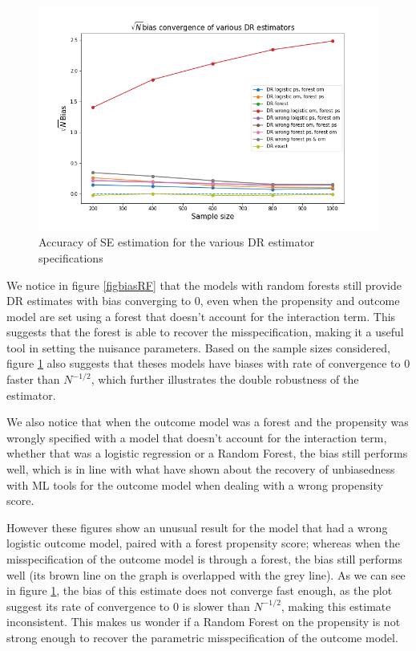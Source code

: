 \documentclass[12pt,twoside]{article}
\begin{document}
\begin{figure} 
    \centering
    \includegraphics[width = 0.9\columnwidth]{figures/sqrtnRF.png}
    \caption{Accuracy of \citet{lunceford_davidian} SE estimation for the various DR estimator specifications}
    \label{figsqrtnRF}
\end{figure}

We notice in figure \ref{figbiasRF} that the models with random forests still provide DR estimates with bias converging to 0, even when the propensity and outcome model are set using a forest that doesn't account for the interaction term. This suggests that the forest is able to recover the misspecification, making it a useful tool in setting the nuisance parameters. Based on the sample sizes considered, figure \ref{figsqrtnRF} also suggests that theses models have biases with rate of convergence to 0 faster than $N^{-1/2}$, which further illustrates the double robustness of the estimator.

We also notice that when the outcome model was a forest and the propensity was wrongly specified with a model that doesn't account for the interaction term, whether that was a logistic regression or a Random Forest, the bias still performs well, which is in line with what \citet{ps_SL} have shown about the recovery of unbiasedness with ML tools for the outcome model when dealing with a wrong propensity score. 

However these figures show an unusual result for the model that had a wrong logistic outcome model, paired with a forest propensity score;  whereas when the misspecification of the outcome model is through a forest, the bias still performs well (its brown line on the graph is overlapped with the grey line). As we can see in figure \ref{figsqrtnRF}, the bias of this estimate does not converge fast enough, as the plot suggest its rate of convergence to 0 is slower than $N^{-1/2}$, making this estimate inconsistent. This makes us wonder if a Random Forest on the propensity is not strong enough to recover the parametric misspecification of the outcome model.
\end{document}
